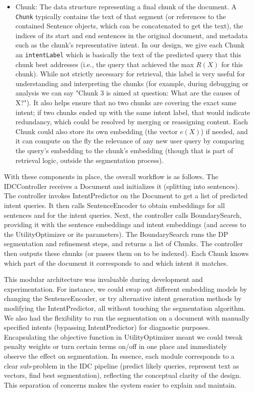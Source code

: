 \documentclass[12pt,a4paper]{report}
\begin{document}
\begin{itemize}
\item Chunk: The data structure representing a final chunk of the document. A \texttt{Chunk} typically contains the text of that segment (or references to the contained Sentence objects, which can be concatenated to get the text), the indices of its start and end sentences in the original document, and metadata such as the chunk's representative intent. In our design, we give each Chunk an \texttt{intentLabel} which is basically the text of the predicted query that this chunk best addresses (i.e., the query that achieved the max $R(X)$ for this chunk). While not strictly necessary for retrieval, this label is very useful for understanding and interpreting the chunks (for example, during debugging or analysis we can say "Chunk 3 is aimed at question: What are the causes of X?"). It also helps ensure that no two chunks are covering the exact same intent; if two chunks ended up with the same intent label, that would indicate redundancy, which could be resolved by merging or reassigning content. Each Chunk could also store its own embedding (the vector $e(X)$) if needed, and it can compute on the fly the relevance of any new user query by comparing the query's embedding to the chunk's embedding (though that is part of retrieval logic, outside the segmentation process).
\end{itemize}

With these components in place, the overall workflow is as follows. The IDCController receives a Document and initializes it (splitting into sentences). The controller invokes IntentPredictor on the Document to get a list of predicted intent queries. It then calls SentenceEncoder to obtain embeddings for all sentences and for the intent queries. Next, the controller calls BoundarySearch, providing it with the sentence embeddings and intent embeddings (and access to the UtilityOptimizer or its parameters). The BoundarySearch runs the DP segmentation and refinement steps, and returns a list of Chunks. The controller then outputs these chunks (or passes them on to be indexed). Each Chunk knows which part of the document it corresponds to and which intent it matches. 

This modular architecture was invaluable during development and experimentation. For instance, we could swap out different embedding models by changing the SentenceEncoder, or try alternative intent generation methods by modifying the IntentPredictor, all without touching the segmentation algorithm. We also had the flexibility to run the segmentation on a document with manually specified intents (bypassing IntentPredictor) for diagnostic purposes. Encapsulating the objective function in UtilityOptimizer meant we could tweak penalty weights or turn certain terms on/off in one place and immediately observe the effect on segmentation. In essence, each module corresponds to a clear sub-problem in the IDC pipeline (predict likely queries, represent text as vectors, find best segmentation), reflecting the conceptual clarity of the design. This separation of concerns makes the system easier to explain and maintain.
\end{document}
